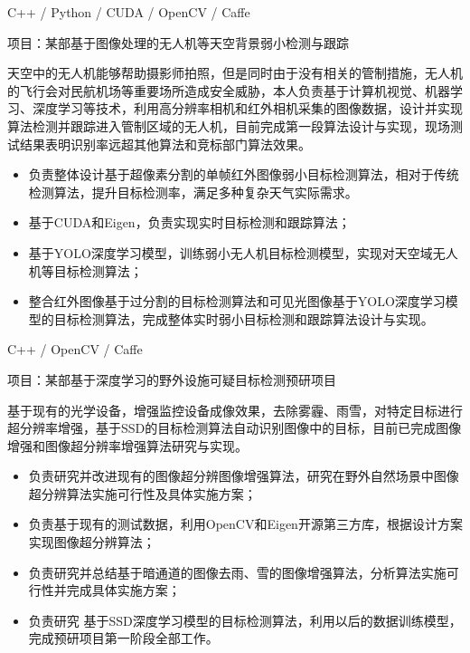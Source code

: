 \documentclass{resume}
\begin{document}
C++ / Python / CUDA / OpenCV / Caffe

项目：某部基于图像处理的无人机等天空背景弱小检测与跟踪

天空中的无人机能够帮助摄影师拍照，但是同时由于没有相关的管制措施，无人机的飞行会对民航机场等重要场所造成安全威胁，本人负责基于计算机视觉、机器学习、深度学习等技术，利用高分辨率相机和红外相机采集的图像数据，设计并实现算法检测并跟踪进入管制区域的无人机，目前完成第一段算法设计与实现，现场测试结果表明识别率远超其他算法和竞标部门算法效果。
\begin{itemize}
  \item 负责整体设计基于超像素分割的单帧红外图像弱小目标检测算法，相对于传统检测算法，提升目标检测率，满足多种复杂天气实际需求。
  \item 基于CUDA和Eigen，负责实现实时目标检测和跟踪算法；
  \item 基于YOLO深度学习模型，训练弱小无人机目标检测模型，实现对天空域无人机等目标检测算法；
  \item 整合红外图像基于过分割的目标检测算法和可见光图像基于YOLO深度学习模型的目标检测算法，完成整体实时弱小目标检测和跟踪算法设计与实现。
\end{itemize}

C++ / OpenCV / Caffe

项目：某部基于深度学习的野外设施可疑目标检测预研项目

基于现有的光学设备，增强监控设备成像效果，去除雾霾、雨雪，对特定目标进行超分辨率增强，基于SSD的目标检测算法自动识别图像中的目标，目前已完成图像增强和图像超分辨率增强算法研究与实现。
\begin{itemize}
  \item 负责研究并改进现有的图像超分辨图像增强算法，研究在野外自然场景中图像超分辨算法实施可行性及具体实施方案；
  \item 负责基于现有的测试数据，利用OpenCV和Eigen开源第三方库，根据设计方案实现图像超分辨算法；
  \item 负责研究并总结基于暗通道的图像去雨、雪的图像增强算法，分析算法实施可行性并完成具体实施方案；
  \item 负责研究 基于SSD深度学习模型的目标检测算法，利用以后的数据训练模型，完成预研项目第一阶段全部工作。
\end{itemize}
\end{document}
